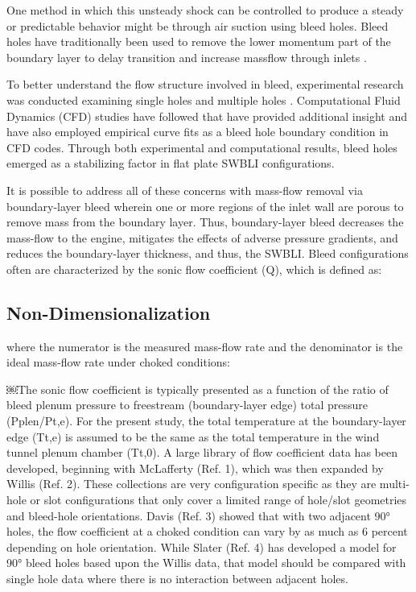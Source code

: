 One method in which this unsteady shock can be controlled to produce a steady or predictable behavior might be through air suction using bleed holes. Bleed holes have traditionally been used to remove the lower momentum part of the boundary layer to delay transition and increase massflow through inlets \cite{Davis2012Fibe}. 

To better understand the flow structure involved in bleed, experimental research was conducted examining single holes \cite{Schoenenberger1999, Davis2012, Eichorn2013, Orkwis2013} and multiple holes \cite{Syberg1973, Paynter1993, Willis1995, Oorebeek2012}. Computational Fluid Dynamics (CFD) studies have followed \cite{Hamed2008, Choe2016, Duncan2016} that have provided additional insight and have also employed empirical curve fits as a bleed hole boundary condition \cite{Harloff1996, Baurle2011, Slater2012} in CFD codes. Through both experimental and computational results, bleed holes emerged as a stabilizing factor in flat plate SWBLI configurations\cite{Hamed1995}.

It is possible to address all of these concerns with mass-flow removal via boundary-layer bleed wherein one or more regions of the inlet wall are porous to remove mass from the boundary layer. Thus, boundary-layer bleed decreases the mass-flow to the engine, mitigates the effects of adverse pressure gradients, and reduces the boundary-layer thickness, and thus, the SWBLI. Bleed configurations often are characterized by the sonic flow coefficient (Q), which is defined as:

\subsection{Non-Dimensionalization}


where the numerator is the measured mass-flow rate and the denominator is the ideal mass-flow rate under choked conditions:


￼The sonic flow coefficient is typically presented as a function of the ratio of bleed plenum pressure to freestream (boundary-layer edge) total pressure (Pplen/Pt,e). For the present study, the total temperature at the boundary-layer edge (Tt,e) is assumed to be the same as the total temperature in the wind tunnel plenum chamber (Tt,0).
A large library of flow coefficient data has been developed, beginning with McLafferty (Ref. 1), which was then expanded by Willis (Ref. 2). These collections are very configuration specific as they are multi-hole or slot configurations that only cover a limited range of hole/slot geometries and bleed-hole orientations. Davis (Ref. 3) showed that with two adjacent 90° holes, the flow coefficient at a choked condition can vary by as much as 6 percent depending on hole orientation. While Slater (Ref. 4) has developed a model for 90° bleed holes based upon the Willis data, that model should be compared with single hole data where there is no interaction between adjacent holes. \cite{Eichorn2013}

